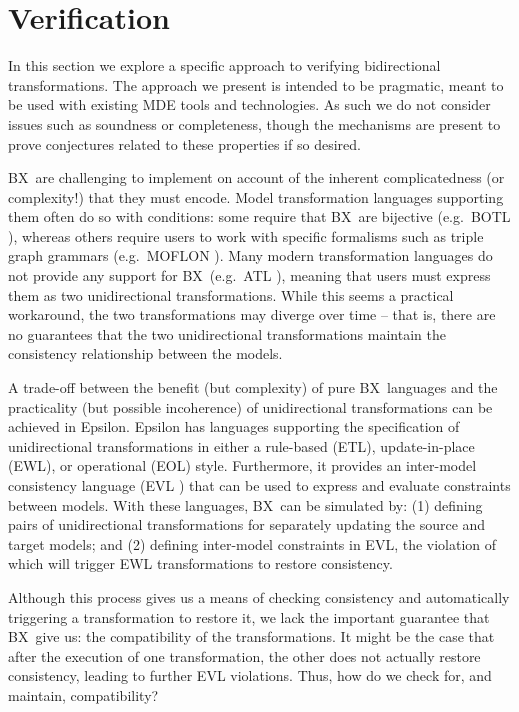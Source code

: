 \section{Verification}
\label{section:verification}

\newcommand{\BX}{BX}

In this section we explore a specific approach to verifying bidirectional transformations. The approach we present is intended to be pragmatic, meant to be used with existing MDE tools and technologies. As such we do not consider issues such as soundness or completeness, though the mechanisms are present to prove conjectures related to these properties if so desired.

\BX\ are challenging to implement on account of the inherent complicatedness (or complexity!) that they must encode. Model transformation languages supporting them often do so with conditions: some require that \BX\ are bijective (e.g.\ BOTL \cite{Braun-Marschall03a}), whereas others require users to work with specific formalisms such as triple graph grammars (e.g.\ MOFLON \cite{AKRS06a}).  Many modern transformation languages do not provide any support for \BX\ (e.g.\ ATL \cite{JABK08a}), meaning that users must express them as two unidirectional transformations. While this seems a practical workaround, the two transformations may diverge over time -- that is, there are no guarantees that the two unidirectional transformations maintain the consistency relationship between the models.
	
A trade-off between the benefit (but complexity) of pure \BX\ languages and the practicality (but possible incoherence) of unidirectional transformations can be achieved in Epsilon. Epsilon has languages supporting the specification of unidirectional transformations in either a rule-based (ETL), update-in-place (EWL), or operational (EOL) \cite{Paige-KRDP09a} style. Furthermore, it provides an inter-model consistency language (EVL \cite{Kolovos-Paige-Polack09a}) that can be used to express and evaluate constraints between models. With these languages, \BX\ can be simulated by: (1) defining pairs of unidirectional transformations for separately updating the source and target models; and (2) defining inter-model constraints in EVL, the violation of which will trigger EWL transformations to restore consistency.
	
Although this process gives us a means of checking consistency and automatically triggering a transformation to restore it, we lack the important guarantee that \BX\ give us: the compatibility of the transformations. It might be the case that after the execution of one transformation, the other does not actually restore consistency, leading to further EVL violations. Thus, how do we check for, and maintain, compatibility? 
	
